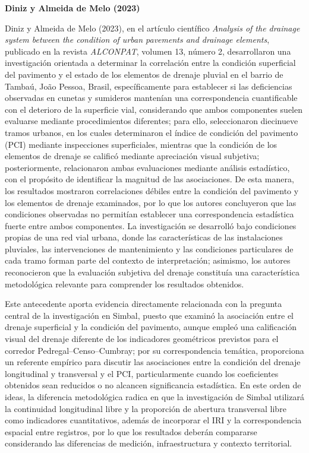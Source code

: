 \begingroup
\setlength{\emergencystretch}{2em}

\noindent\textbf{Diniz y Almeida de Melo (2023)}

Diniz y Almeida de Melo (2023), en el artículo científico \textit{Analysis of the drainage system between the condition of urban pavements and drainage elements}, publicado en la revista \textit{ALCONPAT}, volumen 13, número 2, desarrollaron una investigación orientada a determinar la correlación entre la condición superficial del pavimento y el estado de los elementos de drenaje pluvial en el barrio de Tambaú, João Pessoa, Brasil, específicamente para establecer si las deficiencias observadas en cunetas y sumideros mantenían una correspondencia cuantificable con el deterioro de la superficie vial, considerando que ambos componentes suelen evaluarse mediante procedimientos diferentes; para ello, seleccionaron diecinueve tramos urbanos, en los cuales determinaron el índice de condición del pavimento (PCI) mediante inspecciones superficiales, mientras que la condición de los elementos de drenaje se calificó mediante apreciación visual subjetiva; posteriormente, relacionaron ambas evaluaciones mediante análisis estadístico, con el propósito de identificar la magnitud de las asociaciones. De esta manera, los resultados mostraron correlaciones débiles entre la condición del pavimento y los elementos de drenaje examinados, por lo que los autores concluyeron que las condiciones observadas no permitían establecer una correspondencia estadística fuerte entre ambos componentes. La investigación se desarrolló bajo condiciones propias de una red vial urbana, donde las características de las instalaciones pluviales, las intervenciones de mantenimiento y las condiciones particulares de cada tramo forman parte del contexto de interpretación; asimismo, los autores reconocieron que la evaluación subjetiva del drenaje constituía una característica metodológica relevante para comprender los resultados obtenidos.

Este antecedente aporta evidencia directamente relacionada con la pregunta central de la investigación en Simbal, puesto que examinó la asociación entre el drenaje superficial y la condición del pavimento, aunque empleó una calificación visual del drenaje diferente de los indicadores geométricos previstos para el corredor Pedregal–Censo–Cumbray; por su correspondencia temática, proporciona un referente empírico para discutir las asociaciones entre la condición del drenaje longitudinal y transversal y el PCI, particularmente cuando los coeficientes obtenidos sean reducidos o no alcancen significancia estadística. En este orden de ideas, la diferencia metodológica radica en que la investigación de Simbal utilizará la continuidad longitudinal libre y la proporción de abertura transversal libre como indicadores cuantitativos, además de incorporar el IRI y la correspondencia espacial entre registros, por lo que los resultados deberán compararse considerando las diferencias de medición, infraestructura y contexto territorial.

